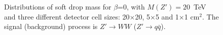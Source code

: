 \begin{figure}
\begin{center}
\end{center}
\caption{Distributions of soft drop mass for $\beta$=0, with $M(Z') = 20$~TeV and three different detector cell sizes: 20$\times$20, 
5$\times$5 and 1$\times$1 cm$^2$. The signal (background) process is 
$Z' \rightarrow WW$ ($Z'\rightarrow q\bar{q}$).
\label{fig:cluster_mass_mmdt_ww}}
\end{figure}

